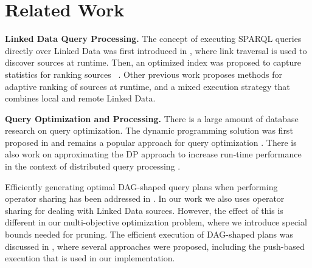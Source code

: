 \vspace{-0.3cm}
\section{Related Work}
\label{sec:related}

\textbf{Linked Data Query Processing.} The concept of executing SPARQL
queries directly over Linked Data was first introduced in \cite{hartig_executing_2009},
where link traversal is used to discover sources at runtime. Then, an optimized index was proposed to capture statistics for ranking sources~
\cite{harth_data_2010}. Other previous work
\cite{ladwig_linked_2010,sihjoin_2011} proposes methods for adaptive ranking
of sources at runtime, and a mixed execution
strategy that combines local and remote Linked Data. %






\textbf{Query Optimization and Processing.} There is a large amount of
database research on query optimization. The dynamic programming
solution was first proposed in \cite{selinger_access_1979} and remains a
popular approach for query optimization
\cite{moerkotte_dynamic_2008}. There is also work on approximating the DP approach to increase run-time
performance in the context of distributed query processing
\cite{kossmann_iterative_2000}.

Efficiently generating optimal DAG-shaped query plans when performing
operator sharing has been addressed in
\cite{neumann_generating_2009}. In our work we also uses operator
sharing for dealing with Linked Data sources. However, the effect of this is different in our multi-objective optimization problem, where we introduce special bounds needed for pruning. 
The efficient
execution of DAG-shaped plans was discussed in \cite{Neumann_2005},
where several approaches were proposed, including the push-based
execution that is used in our implementation. 

